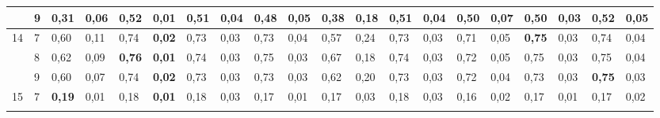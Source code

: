 \documentclass[conference]{IEEEtran}
\begin{document}
\begin{table}[]
\begin{tabular}{|cl|ll|ll|ll|ll|ll|ll|ll|ll|ll|}
		\multicolumn{1}{|c|}{}                    & 9 & \multicolumn{1}{l|}{0,31}          & 0,06          & \multicolumn{1}{l|}{\textbf{0,52}} & \textbf{0,01} & \multicolumn{1}{l|}{0,51}          & 0,04          & \multicolumn{1}{l|}{0,48} & 0,05          & \multicolumn{1}{l|}{0,38}                 & 0,18          & \multicolumn{1}{l|}{0,51}          & 0,04          & \multicolumn{1}{l|}{0,50}          & 0,07          & \multicolumn{1}{l|}{0,50}          & 0,03          & \multicolumn{1}{l|}{0,52}          & 0,05          \\ \hline
		\multicolumn{1}{|c|}{\multirow{3}{*}{14}} & 7 & \multicolumn{1}{l|}{0,60}          & 0,11          & \multicolumn{1}{l|}{0,74}          & \textbf{0,02} & \multicolumn{1}{l|}{0,73}          & 0,03          & \multicolumn{1}{l|}{0,73} & 0,04          & \multicolumn{1}{l|}{0,57}                 & 0,24          & \multicolumn{1}{l|}{0,73}          & 0,03          & \multicolumn{1}{l|}{0,71}          & 0,05          & \multicolumn{1}{l|}{\textbf{0,75}} & 0,03          & \multicolumn{1}{l|}{0,74}          & 0,04          \\ \cline{2-20} 
		\multicolumn{1}{|c|}{}                    & 8 & \multicolumn{1}{l|}{0,62}          & 0,09          & \multicolumn{1}{l|}{\textbf{0,76}} & \textbf{0,01} & \multicolumn{1}{l|}{0,74}          & 0,03          & \multicolumn{1}{l|}{0,75} & 0,03          & \multicolumn{1}{l|}{0,67}                 & 0,18          & \multicolumn{1}{l|}{0,74}          & 0,03          & \multicolumn{1}{l|}{0,72}          & 0,05          & \multicolumn{1}{l|}{0,75}          & 0,03          & \multicolumn{1}{l|}{0,75}          & 0,04          \\ \cline{2-20} 
		\multicolumn{1}{|c|}{}                    & 9 & \multicolumn{1}{l|}{0,60}          & 0,07          & \multicolumn{1}{l|}{0,74}          & \textbf{0,02} & \multicolumn{1}{l|}{0,73}          & 0,03          & \multicolumn{1}{l|}{0,73} & 0,03          & \multicolumn{1}{l|}{0,62}                 & 0,20          & \multicolumn{1}{l|}{0,73}          & 0,03          & \multicolumn{1}{l|}{0,72}          & 0,04          & \multicolumn{1}{l|}{0,73}          & 0,03          & \multicolumn{1}{l|}{\textbf{0,75}} & 0,03          \\ \hline
		\multicolumn{1}{|c|}{\multirow{3}{*}{15}} & 7 & \multicolumn{1}{l|}{\textbf{0,19}} & 0,01          & \multicolumn{1}{l|}{0,18}          & \textbf{0,01} & \multicolumn{1}{l|}{0,18}          & 0,03          & \multicolumn{1}{l|}{0,17} & 0,01          & \multicolumn{1}{l|}{0,17}                 & 0,03          & \multicolumn{1}{l|}{0,18}          & 0,03          & \multicolumn{1}{l|}{0,16}          & 0,02          & \multicolumn{1}{l|}{0,17}          & 0,01          & \multicolumn{1}{l|}{0,17}          & 0,02          \\ \cline{2-20} 

\end{tabular}
\end{table}
\end{document}
